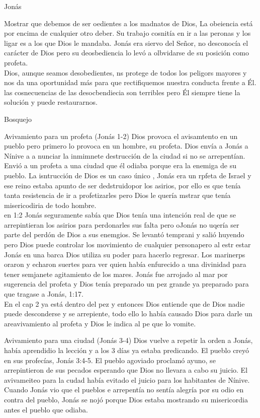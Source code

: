 \documentclass[12pt]{article}
\begin{document}
\begin{section}{Jonás}
\begin{enumerate}
			Mostrar que debemos de ser oedientes a los madnatos de Dios, La obeiencia está por encima de cualquier otro deber. Su trabajo cosnitía en ir a las peronas y los ligar es a los que Dios le mandaba. Jonás era siervo del Señor, no desconocía el carácter de Dios pero su deosbediencia lo levó a olbvidarse de su posición como profeta.\\
			Dios, aunque seamos desobedientes, ns protege de todos los peligors mayores y nos da una oportunidad más para que rectifiquemos nuestra conducta frente a Él. las cosnecuencias de las desocbendiecia son terribles pero Él siempre tiene la solución y puede restaurarnos.
	\end{enumerate}
	\begin{subsection}{Bosquejo}
		\begin{subsubsection}{Avivamiento para un profeta (Jonás 1-2)}
			Dios provoca el avisamtento en un pueblo pero primero lo provoca en un hombre, su profeta. Dios envía a Jonás a Nínive a a nunciar la inmimnete destrucción de la ciudad si no se arrepentían. Envió a un profeta a una ciudad que él odiaba porque era la enemiga de su pueblo. La isntrucción de Dios es un caso único , Jonás era un rpfeta de Israel y ese reino estaba apunto de ser dedstruidopor los asirios, por ello es que tenía tanta resistencia de ir a profetizarles pero Dios le quería mstrar que tenía misericodiria de todo hombre.\\
			en 1:2 Jonás seguramente sabía que Dios tenía una intención real de que se arrepintieran los asirios para perdonarles sus falta pero oJonás no uqería ser parte del perdón de Dios a sus enemgios. Se levantó temprani y salió huyendo pero Dios puede controlar los movimiento de cualquier personapero al estr estar Jonás en una barca Dios utiliza su poder para hacerlo regresar. Los marinerps oraron y echaron suertes para ver quien había enfurecido a una divinidad para tener semjanete agitamiento de los mares. Jonás fue arrojado al mar por sugerencia del profeta y Dios tenía preparado un pez grande ya preparado para que tragase a Jonás, 1:17.\\
			En el cap 2 ya está dentro del pez y entonces Dios entiende que de Dios nadie puede desconderse y se arrepiente, todo ello lo había causado Dios para darle un areavivamiento al profeta y Dios le indica al pe que lo vomite.
		\end{subsubsection}
		\begin{subsubsection}{Avivamiento para una ciudad (Jonás 3-4)}
			Dios vuelve a repetir la orden a Jonás, había aprendidio la lección y a los 3 días ya estaba predicando. El pueblo creyó en sus profecías, Jonás 3:4-5. El pueblo agoviado proclamó ayuno, se arrepintieron de sus pecados esperando que Dios no llevara a cabo su juicio. El avivameiteo para la cudad había evitado el juicio para los habitantes de Nínive. Cuando Jonás vio que el pueblos e arrepentía no sentía alegría por su odio en contra del pueblo, Jonás se nojó porque Dios estaba  mostrando su misericordia antes el pueblo que odiaba.\\

\end{subsubsection}
\end{subsection}
\end{section}
\end{document}
